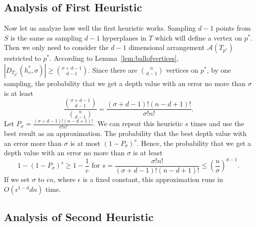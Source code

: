 \documentclass[preprint, 12pt]{elsarticle}
\begin{document}

\subsection{Analysis of First Heuristic}
Now let us analyze how well the first heuristic works. Sampling $d - 1$ points from $S$ is the same as sampling $d - 1$ hyperplanes in $T$ which will define a vertex on $p^{*}$. Then we only need to consider the $d-1$ dimensional arrangement $\mathcal{A}(T_{p^{*}})$ restricted to $p^{*}$. According to Lemma~\ref{lem:ballofvertices}, $|D_{T_{p^{*}}}(h_{v}^{*},\sigma)| \geq \binom{\sigma+d-1}{d-1}$. Since there are $\binom{n}{d-1}$ vertices on $p^{*}$, by one sampling, the probability that we get a depth value with an error no more than $\sigma$ is at least
\begin{equation}
  \label{eq:prbvertex}
  \frac{\binom{\sigma+d-1}{d-1}}{\binom{n}{d-1}} = \frac{(\sigma+d-1)!(n-d+1)!}{\sigma!n!} .%
\end{equation}
Let $P_{\sigma} = \frac{(\sigma+d-1)!(n-d+1)!}{\sigma!n!}$. We can repeat this heuristic $s$ times and use the best result as an approximation. The probability that the best depth value with an error more than $\sigma$ is at most $(1 - P_{\sigma})^{s}$. Hence, the probability that we get a depth value with an error no more than $\sigma$ is at least
\begin{equation}
  \label{eq:prbappr}
  1 - (1 - P_{\sigma})^{s} \geq 1 - \frac{1}{e} \textrm{ for } s = \frac{\sigma!n!}{(\sigma+d-1)!(n-d+1)!} \leq \left( \frac{n}{\sigma} \right)^{d-1} .
\end{equation}
If we set $\sigma$ to $\epsilon n$, where $\epsilon$ is a fixed constant, this approximation runs in $O(\epsilon^{1-d}dn)$ time.

\subsection{Analysis of Second Heuristic}
\end{document}
